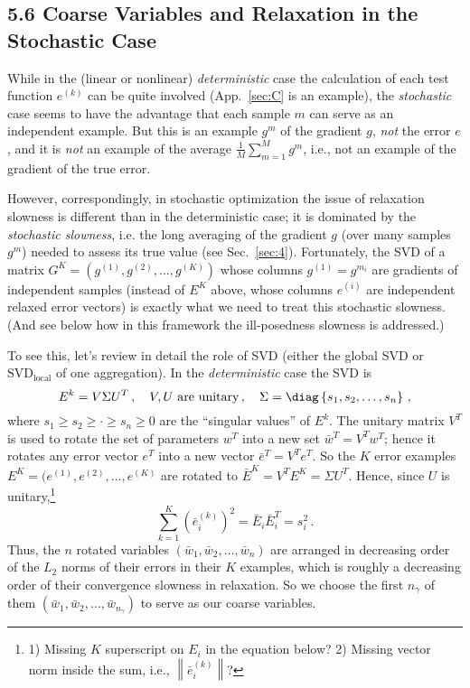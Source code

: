 \documentclass{article} %
\begin{document}
\subsection{5.6 Coarse Variables and Relaxation in the Stochastic Case}
While in the (linear or nonlinear) {\it deterministic} case the calculation of each test function $e^{(k)}$ can be quite involved (App.~\ref{sec:C} is an example), the {\it stochastic} case seems to have the advantage that each sample $m$ can serve as an independent example. But this is an example $g^m$ of the gradient $g$, {\it not} the error $e$, and it is {\it not} an example of the average $\frac{1}{M} \sum_{m=1}^M g^m$, i.e., not an example of the gradient of the true error.

However, correspondingly, in stochastic optimization the issue of relaxation slowness is different than in the deterministic case; it is dominated by the {\it stochastic slowness}, i.e. the long averaging of the gradient $g$ (over many samples $g^m$) needed to assess its true value (see Sec.~\ref{sec:4}). Fortunately, the SVD of a matrix $G^K = (g^{(1)},g^{(2)},\dots,g^{(K)})$ whose columns $g^{(1)}=g^{m_i}$ are gradients of independent samples (instead of $E^K$ above, whose columns $e^{(i)}$ are independent relaxed error vectors) is exactly what we need to treat this stochastic slowness. (And see below how in this framework the ill-posedness slowness is addressed.)

To see this, let's review in detail the role of SVD (either the global SVD or $\text{SVD}_{\text{local}}$ of one aggregation). In the {\it deterministic} case the SVD is
$$ E^k = V \Sigma U^T\,,\quad V, U \text{ are unitary}\,,\quad \Sigma = \diag\left\{s_1, s_2, \dots, s_n \right\}\,,$$
where $s_1 \geq s_2 \geq \cdot \geq s_n \geq 0$ are the ``singular values'' of $E^k$. The unitary matrix $V^T$ is used to rotate the set of parameters $w^T$ into a new set $\bar{w}^T = V^T w^T$; hence it rotates any error vector $e^T$ into a new vector $\bar{e}^T = V^T e^T$. So the $K$ error examples $E^K = (e^{(1)},e^{(2)},\dots,e^{(K)}$ are rotated to $\bar{E}^K = V^T E^K = \Sigma U^T$. Hence, since $U$ is unitary,\footnote{1) Missing $K$ superscript on $E_i$ in the equation below? 2) Missing vector norm inside the sum, i.e., $\left\|\bar{e}_i^{(k)}\right\|$?}
$$ \sum_{k=1}^K \left(\bar{e}_i^{(k)}\right)^2 = \bar{E}_i \bar{E}_i^T = s_i^2\,.$$
Thus, the $n$ rotated variables $(\bar{w}_1,\bar{w}_2,\dots,\bar{w}_n)$ are arranged in decreasing order of the $L_2$ norms of their errors in their $K$ examples, which is roughly a decreasing order of their convergence slowness in relaxation. So we choose the first $n_{\gamma}$ of them $(\bar{w}_1,\bar{w}_2,\dots,\bar{w}_{n_{\gamma}})$ to serve as our coarse variables.
\end{document}

